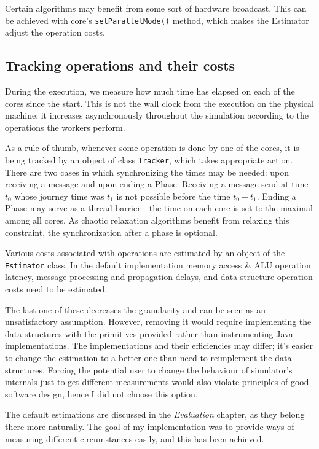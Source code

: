 \documentclass[12pt,a4paper,twoside,openright]{report}
\begin{document}
Certain algorithms may benefit from some sort of hardware broadcast. This can be achieved with core's \texttt{setParallelMode()} method, which makes the Estimator adjust the operation costs. 

\subsection{Tracking operations and their costs}
During the execution, we measure how much time has elapsed on each of the cores since the start. This is not the wall clock from the execution on the physical machine; it increases asynchronously throughout the simulation according to the operations the workers perform.

As a rule of thumb, whenever some operation is done by one of the cores, it is being tracked by an object of class \texttt{Tracker}, which takes appropriate action. There are two cases in which synchronizing the times may be needed: upon receiving a message and upon ending a Phase. Receiving a message send at time $t_0$ whose journey time was $t_1$ is not possible before the time $t_0+t_1$. Ending a Phase may serve as a thread barrier - the time on each core is set to the maximal among all cores. As chaotic relaxation algorithms benefit from relaxing this constraint, the synchronization after a phase is optional.

Various costs associated with operations are estimated by an object of the \texttt{Estimator} class. In the default implementation memory access \& ALU operation latency, message processing and propagation delays, and data structure operation costs need to be estimated. 

The last one of these decreases the granularity and can be seen as an unsatisfactory assumption. However, removing it would require implementing the data structures with the primitives provided rather than instrumenting Java implementations. The implementations and their efficiencies may differ; it's easier to change the estimation to a better one than need to reimplement the data structures. Forcing the potential user to change the behaviour of simulator's internals just to get different measurements would also violate principles of good software design, hence I did not choose this option.

The default estimations are discussed in the \textit{Evaluation} chapter, as they belong there more naturally. The goal of my implementation was to provide ways of measuring different circumstances easily, and this has been achieved.
\end{document}
